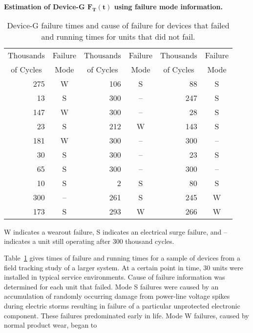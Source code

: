 \begin{example}
{\bf Estimation of Device-G $\boldsymbol{F_{T}(t)}$ 
using failure mode information.}
\label{example:deviceg}
\begin{table}
\caption{Device-G failure times and cause of failure  
for devices that failed and running times for units that did not
fail.}
\centering\small
\begin{tabular}{rcrcrc} 
\\[-.5ex]
\hline
\multicolumn{1}{c}{Thousands}&{Failure}&\multicolumn{1}{c}{Thousands}&{Failure}&\multicolumn{1}{c}{Thousands}&{Failure}\\
\multicolumn{1}{c}{of Cycles}&{Mode}&\multicolumn{1}{c}{of
Cycles}&{Mode}&\multicolumn{1}{c}{of Cycles}&{Mode}\\
\hline
275  & W  &  106  &  S  &   88  & S \\
 13  &  S &   300 &   -- &   247 &  S  \\
147  &  W &   300 &   -- &    28 &  S  \\
 23  &  S &   212 &   W &   143 &  S  \\
181  &  W &   300 &   -- &   300 &  --  \\
 30  &  S &   300 &   -- &    23 &  S  \\
 65  &  S &   300 &   -- &   300 &  --  \\
 10  &  S &     2 &   S &    80 &  S  \\
300  &  -- &   261 &   S &   245 &  W  \\
173  &  S &   293 &   W &   266 &  W  \\
\hline
\end{tabular}
\begin{minipage}[t]{4in}
W indicates a wearout failure, S indicates an electrical surge
failure, and -- indicates a unit still operating after 300 thousand
cycles.
\label{table:deviceg.data}
\end{minipage}
\end{table}
Table~\ref{table:deviceg.data} gives times of failure and running
times for a sample of devices from a field tracking study of a
larger system. At a certain point in time, 30 units were installed
in typical service environments. Cause of failure information was
determined for each unit that failed. Mode S failures were caused by
an accumulation of randomly occurring damage from power-line voltage
spikes during electric storms resulting in failure of a particular
unprotected electronic component. These failures predominated early
in life. Mode W failures, caused by normal product wear, began to

\end{example}
